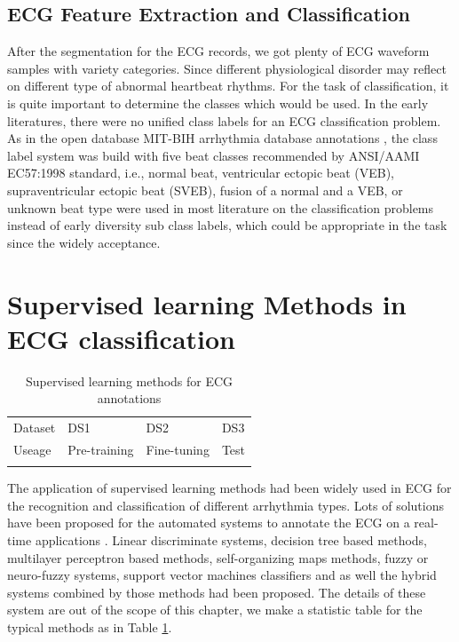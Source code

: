 \documentclass[graybox]{svmult}
\begin{document}
\subsection{ECG Feature Extraction and Classification}
After the segmentation for the ECG records, we got plenty of ECG waveform samples with variety categories. Since different physiological disorder may reflect on different type of abnormal heartbeat rhythms. For the task of classification, it is quite important to determine the classes which would be used. In the early literatures, there were no unified class labels for an ECG classification problem. As in the open database MIT-BIH arrhythmia database annotations \citep{mark1982annotated, moody1990bih}, the class label system was build with five beat classes recommended by ANSI/AAMI EC57:1998 standard, i.e., normal beat, ventricular ectopic beat (VEB), supraventricular ectopic beat (SVEB), fusion of a normal and a VEB, or unknown beat type were used in most literature on the classification problems instead of early diversity sub class labels, which could be appropriate in the task since the widely acceptance. 


\section{Supervised learning Methods in ECG classification}

\begin{table}
\caption{Supervised learning methods for ECG annotations}
\label{tab:0}       %
%
%
\begin{tabular}{p{2.9cm}p{2.8cm}p{2.8cm}p{2.8cm}}
\hline\noalign{\smallskip}
Dataset & DS1 & DS2 & DS3   \\

\noalign{\smallskip}\svhline\noalign{\smallskip}
Useage & Pre-training & Fine-tuning & Test   \\


\noalign{\smallskip}\hline\noalign{\smallskip}
\end{tabular}
\end{table}

The application of supervised learning methods had been widely used in ECG for the recognition and classification of different arrhythmia types.
Lots of solutions have been proposed for the automated systems to annotate the ECG on a real-time applications \citep{osowski2001ecg}. 
Linear discriminate systems, decision tree based methods, multilayer perceptron based methods, self-organizing maps methods, fuzzy or neuro-fuzzy systems, support vector machines classifiers and as well the hybrid systems combined by those methods had been proposed. The details of these system are out of the scope of this chapter, we make a statistic table for the typical methods as in Table \ref{tab:0}.
\end{document}
